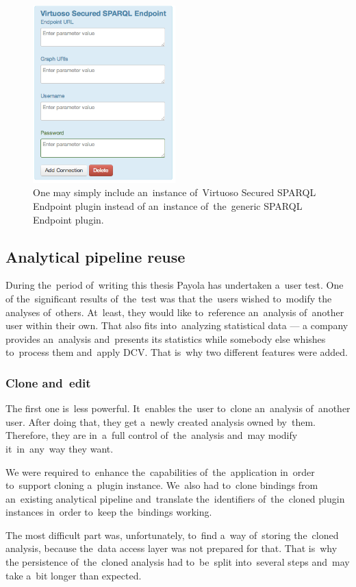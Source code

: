 \begin{figure}
	\centering
	\includegraphics[width=55mm]{img/secured.png}
	\caption{One may simply include an~instance of~Virtuoso Secured SPARQL Endpoint plugin instead
	of an~instance of~the~generic SPARQL Endpoint plugin.}
	\label{fig:secured-ds}
\end{figure}

\subsection{Analytical pipeline reuse}
During the~period of~writing this thesis Payola has undertaken a~user test. One 
of the~significant results of~the~test was that the~users wished to~modify the
analyses of~others. At~least, they would like to~reference an~analysis of~another user within their own. That also fits into~analyzing statistical data --- 
a company provides an~analysis and~presents its statistics while somebody else 
whishes to~process them and~apply DCV. That is~why two different features 
were added.

\subsubsection{Clone and~edit}
The first one is~less powerful. It~enables the~user to~clone an~analysis of~another user. After doing that, they get a~newly created analysis owned by~them. Therefore, they are in~a~full control of~the~analysis and~may modify it~in~any~way they want.

We were required to~enhance the~capabilities of~the~application in~order to~support cloning a~plugin instance. We~also had to~clone bindings from an~existing analytical pipeline and~translate the~identifiers of~the~cloned plugin 
instances in~order to~keep the~bindings working.

The most difficult part was, unfortunately, to~find a~way of~storing the~cloned 
analysis, because the~data access layer was not prepared for that. That is~why
the persistence of~the~cloned analysis had to~be~split into~several steps and~may take a~bit longer than expected.

